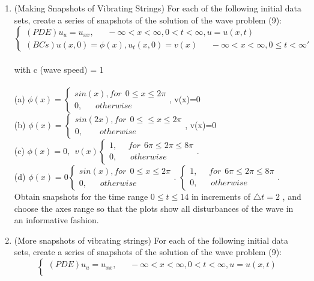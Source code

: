 \documentclass[../main.tex]{subfiles}
\begin{document}
\begin{enumerate}
 \item
		(Making Snapshots of Vibrating Strings) For each of the following initial data sets, create a 
series of snapshots of the solution of the wave problem (9): 
$$
\begin{cases} 
(PDE) u_u=u_{xx}, ~~~~~~~ -\infty <x< \infty ,0<t< \infty , u=u(x,t)\\ 
(BCs) u(x,0)=\phi (x) , u_t(x,0)=v(x) ~~~~~~~ -\infty <x <\infty ,0 \leqslant t< \infty '
\end{cases}$$
\\
with c (wave speed) = 1
\\
\\
(a) 
$\phi(x)=
\begin{cases} 
sin(x), for~~ 0 \leqslant x\leqslant 2 \pi \\
0, ~~~~~~~otherwise
\end{cases}$, v(x)=0
\\
(b)
$\phi(x)=
\begin{cases} 
sin(2x), for~~ 0\leqslant \leqslant x\leqslant 2 \pi \\
0, ~~~~~~~~~otherwise
\end{cases}$, v(x)=0
\\
(c)
$\phi(x)=0 , ~~ v(x)
\begin{cases} 
1 , ~~~~~~for~~ 6 \pi  \leqslant 2\pi \leqslant 8\pi\\
0, ~~~~~~~otherwise
\end{cases}$.
\\
(d)
$\phi(x)=0
\begin{cases} 
sin(x), for ~~0 \leqslant x\leqslant 2 \pi \\
0, ~~~~~~~otherwise
\end{cases}$.
$\begin{cases} 
1 , ~~~~~~for~~ 6 \pi \leqslant 2 \pi \leqslant 8\pi  \\
0, ~~~~~~~otherwise
\end{cases}$.
\\
Obtain snapshots for the time range $0\leqslant t \leqslant 14$ in increments of $\bigtriangleup t=2$ , and choose the axes 
range so that the plots show all disturbances of the wave in an informative fashion. 
	\item
			(More snapshots of vibrating strings) For each of the following initial data sets, create a series 
of snapshots of the solution of the wave problem (9): 
$$\begin{cases} 
(PDE) u_u=u_{xx}, ~~~~~~~ -\infty <x< \infty ,0<t< \infty , u=u(x,t)\\ 

\end{cases}$$
\end{enumerate}
\end{document}

